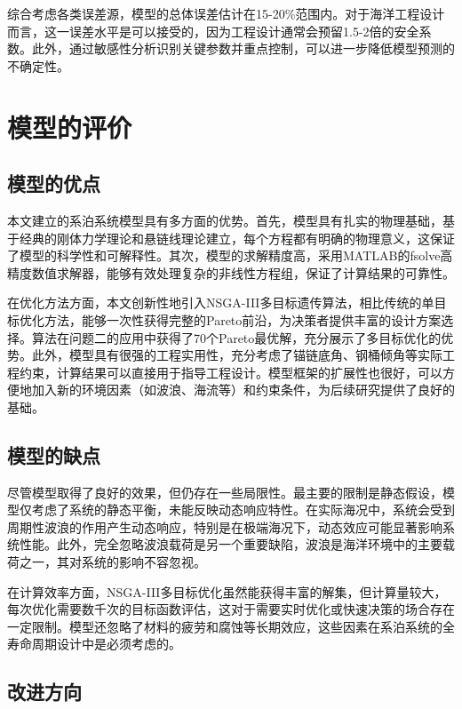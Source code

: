\documentclass[withoutpreface,bwprint]{cumcmthesis}
\begin{document}
综合考虑各类误差源，模型的总体误差估计在15-20\%范围内。对于海洋工程设计而言，这一误差水平是可以接受的，因为工程设计通常会预留1.5-2倍的安全系数。此外，通过敏感性分析识别关键参数并重点控制，可以进一步降低模型预测的不确定性。


\section{模型的评价}

\subsection{模型的优点}

本文建立的系泊系统模型具有多方面的优势。首先，模型具有扎实的物理基础，基于经典的刚体力学理论和悬链线理论建立，每个方程都有明确的物理意义，这保证了模型的科学性和可解释性。其次，模型的求解精度高，采用MATLAB的fsolve高精度数值求解器，能够有效处理复杂的非线性方程组，保证了计算结果的可靠性。

在优化方法方面，本文创新性地引入NSGA-III多目标遗传算法，相比传统的单目标优化方法，能够一次性获得完整的Pareto前沿，为决策者提供丰富的设计方案选择。算法在问题二的应用中获得了70个Pareto最优解，充分展示了多目标优化的优势。此外，模型具有很强的工程实用性，充分考虑了锚链底角、钢桶倾角等实际工程约束，计算结果可以直接用于指导工程设计。模型框架的扩展性也很好，可以方便地加入新的环境因素（如波浪、海流等）和约束条件，为后续研究提供了良好的基础。

\subsection{模型的缺点}

尽管模型取得了良好的效果，但仍存在一些局限性。最主要的限制是静态假设，模型仅考虑了系统的静态平衡，未能反映动态响应特性。在实际海况中，系统会受到周期性波浪的作用产生动态响应，特别是在极端海况下，动态效应可能显著影响系统性能。此外，完全忽略波浪载荷是另一个重要缺陷，波浪是海洋环境中的主要载荷之一，其对系统的影响不容忽视。

在计算效率方面，NSGA-III多目标优化虽然能获得丰富的解集，但计算量较大，每次优化需要数千次的目标函数评估，这对于需要实时优化或快速决策的场合存在一定限制。模型还忽略了材料的疲劳和腐蚀等长期效应，这些因素在系泊系统的全寿命周期设计中是必须考虑的。

\subsection{改进方向}
\end{document}
